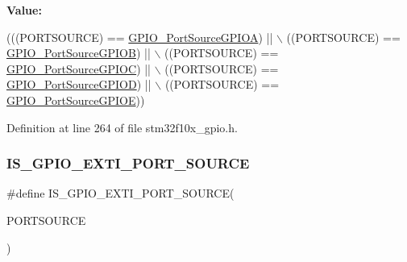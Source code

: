 {\bfseries Value\+:}
\begin{DoxyCode}
(((PORTSOURCE) == \hyperlink{group___g_p_i_o___port___sources_gacddaa6b6535b5de02ba99e75111c4924}{GPIO\_PortSourceGPIOA}) || \(\backslash\)
                                                  ((PORTSOURCE) == 
      \hyperlink{group___g_p_i_o___port___sources_ga20a7ea6589564aee1fd5344bf01e65e5}{GPIO\_PortSourceGPIOB}) || \(\backslash\)
                                                  ((PORTSOURCE) == 
      \hyperlink{group___g_p_i_o___port___sources_ga7511e96933d503ecf7128ebaff613e7e}{GPIO\_PortSourceGPIOC}) || \(\backslash\)
                                                  ((PORTSOURCE) == 
      \hyperlink{group___g_p_i_o___port___sources_ga68309c29660ae328d3699781520e3d21}{GPIO\_PortSourceGPIOD}) || \(\backslash\)
                                                  ((PORTSOURCE) == 
      \hyperlink{group___g_p_i_o___port___sources_ga8b849f35292768d73a9f9a76cac96456}{GPIO\_PortSourceGPIOE}))
\end{DoxyCode}


Definition at line 264 of file stm32f10x\+\_\+gpio.\+h.

\mbox{\label{group___g_p_i_o___port___sources_ga53c3a469f6b286da38bc198acf25e8f1}} 
\subsubsection{\texorpdfstring{I\+S\+\_\+\+G\+P\+I\+O\+\_\+\+E\+X\+T\+I\+\_\+\+P\+O\+R\+T\+\_\+\+S\+O\+U\+R\+CE}{IS\_GPIO\_EXTI\_PORT\_SOURCE}}
{\footnotesize\ttfamily \#define I\+S\+\_\+\+G\+P\+I\+O\+\_\+\+E\+X\+T\+I\+\_\+\+P\+O\+R\+T\+\_\+\+S\+O\+U\+R\+CE(\begin{DoxyParamCaption}\item[{}]{P\+O\+R\+T\+S\+O\+U\+R\+CE }\end{DoxyParamCaption})}

